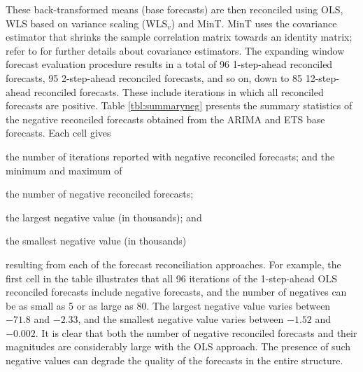 \documentclass[11pt]{article}
\newcommand{\0}{\phantom{0}}
\begin{document}
These back-transformed means (base forecasts) are then reconciled using OLS, WLS based on variance scaling (WLS$_{v}$) and MinT. MinT uses the covariance estimator that shrinks the sample correlation matrix towards an identity matrix; refer to \citet{Wick2018} for further details about covariance estimators. The expanding window forecast evaluation procedure results in a total of 96 1-step-ahead reconciled forecasts, 95 2-step-ahead reconciled forecasts, and so on, down to 85 12-step-ahead reconciled forecasts. These include iterations in which all reconciled forecasts are positive. Table \ref{tbl:summaryneg} presents the summary statistics of the negative reconciled forecasts obtained from the ARIMA and ETS base forecasts. Each cell gives \begin{inparaenum}[(i)] \item the number of iterations reported with negative reconciled forecasts; and the minimum and maximum of \item the number of negative reconciled forecasts; \item the largest negative value (in thousands); and \item the smallest negative value (in thousands) \end{inparaenum} resulting from each of the forecast reconciliation approaches. For example, the first cell in the table illustrates that all 96 iterations of the 1-step-ahead OLS reconciled forecasts include negative forecasts, and the number of negatives can be as small as 5 or as large as 80. The largest negative value varies between $-71.8$ and $-2.33$, and the smallest negative value varies between $-1.52$ and $-0.002$. It is clear that both the number of negative reconciled forecasts and their magnitudes are considerably large with the OLS approach. The presence of such negative values can degrade the quality of the forecasts in the entire structure.
\end{document}
